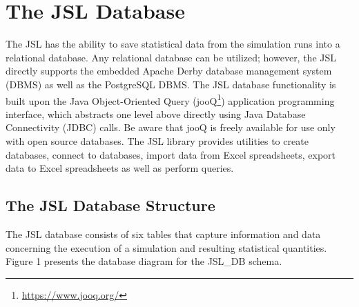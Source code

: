 \documentclass[
]{book}
\renewcommand{\href}[2]{#2\footnote{\url{#1}}}
\theoremstyle{definition}
\theoremstyle{definition}
\theoremstyle{definition}
\theoremstyle{definition}
\theoremstyle{remark}
\begin{document}
\hypertarget{the-jsl-database}{%
\section{The JSL Database}\label{the-jsl-database}}

The JSL has the ability to save statistical data from the simulation
runs into a relational database. Any relational database can be
utilized; however, the JSL directly supports the embedded Apache Derby
database management system (DBMS) as well as the PostgreSQL DBMS. The JSL
database functionality is built upon the Java Object-Oriented Query
(\href{https://www.jooq.org/}{jooQ}) application programming interface, which abstracts one level
above directly using Java Database Connectivity (JDBC) calls. Be aware
that jooQ is freely available for use only with open source databases.
The JSL library provides utilities to create databases, connect to
databases, import data from Excel spreadsheets, export data to Excel
spreadsheets as well as perform queries.

\hypertarget{the-jsl-database-structure}{%
\subsection{The JSL Database Structure}\label{the-jsl-database-structure}}

The JSL database consists of six tables that capture information and
data concerning the execution of a simulation and resulting statistical
quantities. Figure 1 presents the database diagram for the JSL\_DB
schema.
\end{document}
